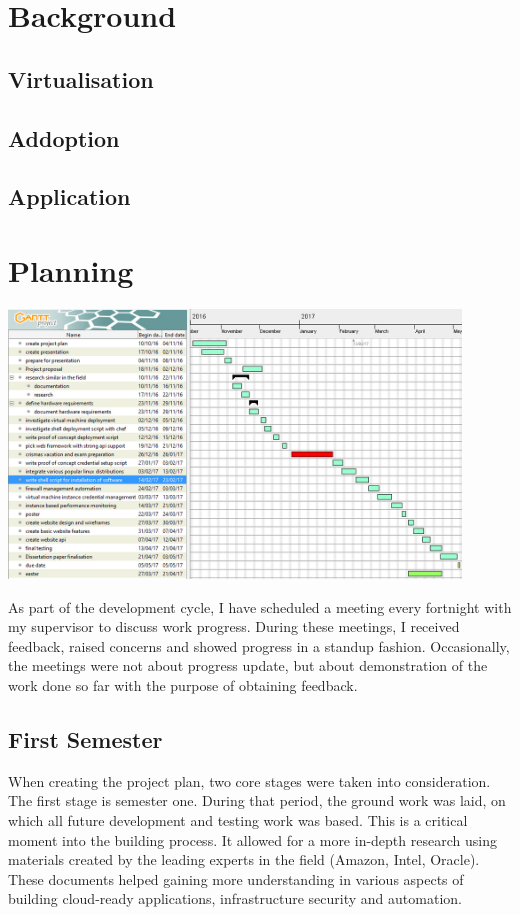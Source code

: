 \documentclass{article}
\begin{document}
\newpage
\section{Background}
\subsection{Virtualisation}
\subsection{Addoption}
\subsection{Application}
\newpage
\section{Planning}

\begin{center}
    \includegraphics[width=12cm]{gantt.jpg}
\end{center}

As part of the development cycle, I have scheduled a meeting every fortnight with my supervisor to discuss work progress. During these meetings, I received feedback, raised concerns and showed progress in a \gls{standup} fashion. Occasionally, the meetings were not about progress update, but about demonstration of the work done so far with the purpose of obtaining feedback.

\subsection{First Semester}
When creating the project plan, two core stages were taken into consideration. The first stage is semester one. During that period, the ground work was laid, on which all future development and testing work was based. This is a critical moment into the building process. It allowed for a more in-depth research using materials created by the leading experts in the field (Amazon, Intel, Oracle). These documents helped gaining more understanding in various aspects of building cloud-ready applications, infrastructure security and automation.
\end{document}
